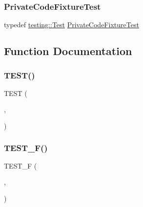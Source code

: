\subsubsection{\texorpdfstring{PrivateCodeFixtureTest}{PrivateCodeFixtureTest}}
{\footnotesize\ttfamily typedef \mbox{\hyperlink{classtesting_1_1_test}{testing\+::\+Test}} \mbox{\hyperlink{googletest-master_2googletest_2test_2gtest__prod__test_8cc_a89debba10c803e339ce0f9b0b34a2267}{Private\+Code\+Fixture\+Test}}}



\subsection{Function Documentation}
\mbox{\label{googletest-master_2googletest_2test_2gtest__prod__test_8cc_a8e307a199011c2979d4a63464d245f4a}} 
\subsubsection{\texorpdfstring{TEST()}{TEST()}}
{\footnotesize\ttfamily T\+E\+ST (\begin{DoxyParamCaption}\item[{Private\+Code\+Test}]{,  }\item[{Can\+Access\+Private\+Members}]{ }\end{DoxyParamCaption})}

\mbox{\label{googletest-master_2googletest_2test_2gtest__prod__test_8cc_a5e21e7e8dd53f2de05e9e6941b6612d3}} 
\subsubsection{\texorpdfstring{TEST\_F()}{TEST\_F()}}
{\footnotesize\ttfamily T\+E\+S\+T\+\_\+F (\begin{DoxyParamCaption}\item[{\mbox{\hyperlink{googletest-master_2googletest_2test_2gtest__prod__test_8cc_a89debba10c803e339ce0f9b0b34a2267}{Private\+Code\+Fixture\+Test}}}]{,  }\item[{Can\+Access\+Private\+Members}]{ }\end{DoxyParamCaption})}

